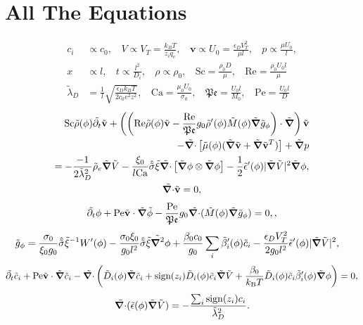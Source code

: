 \documentclass[a4paper,10pt]{article}
\renewcommand{\v}[1]{\mathbf{#1}}
\renewcommand{\v}[1]{\ensuremath{\mathbf{#1}}} %
\newcommand{\ti}[1]{\ensuremath{\tilde{#1}}} %
\newcommand{\gv}[1]{\ensuremath{\mbox{\boldmath$ #1 $}}}
\newcommand{\grad}[1]{\gv{\nabla} #1} %
\renewcommand{\div}[1]{\gv{\nabla} \cdot #1} %
\newcommand{\laplacian}[1]{\grad^2 #1}
\newcommand{\pdt}[1]{\partial_t #1}
\begin{document}
\section{All The Equations}
\begin{align}
c_i &\propto c_0, ~~~~ V \propto V_T = \frac{k_B T}{z_i q_e}, ~~~~\v{v} \propto U_0 = \frac{\epsilon_D V_T^2}{\mu l}, ~~~~p \propto \frac{\mu U_0}{l},\\
x &\propto l , ~~~~ t \propto \frac{l^2}{D_i}, ~~~~ \rho \propto \rho_0, ~~~~ \mathrm{Sc} = \frac{\rho_0 D}{\mu}, ~~~~\mathrm{Re} = \frac{\rho_0 U_0 l}{\mu} \\
\tilde{\lambda}_D &= \frac{1}{l}\sqrt{\frac{\epsilon_D k_B T}{2 c_0 e^2 z^2}}, ~~~~ \mathrm{Ca} = \frac{\mu_0 U_0}{\sigma_0}, ~~~~\mathfrak{Pe} = \frac{U_0 l}{M_0}, ~~~~ \mathrm{Pe} = \frac{U_0 l}{D }
\end{align}
\begin{gather}
\begin{split}	
\mathrm{Sc} \ti{\rho}(\phi) \ti{\pdt{}} \ti{\v{v}}
+ \left( \left( \mathrm{Re} \ti\rho(\phi) \ti{\v{v}} - \frac{\mathrm{Re} }{\mathfrak{Pe}}g_0\ti\rho'(\phi) \ti M(\phi) \ti{\grad{}} \ti g_\phi  \right) \cdot \ti{\grad{}} \right) \ti{\v{v}}\\
- \ti{\div{}} \left[\ti \mu(\phi)(\ti{\grad{}} \ti{\v{v}} + \ti{\grad{}} \ti{\v{v}} ^T) \right] + \ti{\grad{}} p \\
= - \frac{-1}{2\tilde{\lambda}_D^2} \ti \rho_e \ti{\grad{}} \ti{V} - \frac{ \xi_0 }{l\mathrm{Ca}}\hat{\ti{\sigma}} \ti \xi\ti{\div{}} \left[ \ti{\grad{}} \phi \otimes \ti{\grad{}} \phi \right] - \frac 1 2 \ti \epsilon'(\phi) | \ti{\grad{}} \ti V |^2 \ti{\grad{}} \phi,
\end{split}\\
\ti{\div{}} \ti{\v{v}} = 0, 
\end{gather}
\begin{gather}
\ti{\pdt{}} \phi + \mathrm{Pe}\ti{\v v} \cdot \ti{\grad{}}\ti{\phi} - \frac{\mathrm{Pe} }{\mathfrak{Pe}} g_0\ti{\div{}} (\ti{M}(\phi) \ti{\grad{}} \ti{g}_\phi ) = 0,,
\end{gather}
\begin{align}
\tilde{g}_\phi &= \frac{\sigma_0}{\xi_0 g_0 }\hat{\ti{\sigma}}\ti{\xi}^{-1}W'(\phi) - \frac{\sigma_0 \xi_0}{g_0 l^2}\hat{\ti{\sigma}}\ti{\xi}\ti{\laplacian{}}\phi + \frac{\beta_0 c_0}{g_0}\sum_i \ti{\beta}_i'(\phi) \ti{c}_i - \frac{\epsilon_D V_T^2}{2 g_0 l^2} \ti{\epsilon}'(\phi) | \ti{\grad{}} \ti{V} |^2 ,
\end{align}
\begin{gather}
\ti{\pdt{}} \ti{c}_i + \mathrm{Pe}\ti{\v{v}} \cdot \ti{\grad{}} \ti{c}_i - \ti{\div{}} \left( \ti{D}_{i} (\phi) \ti{\grad{}} \ti{c}_i + \mathrm{sign}(z_i)\ti{D}_i(\phi)\ti{c}_i \ti{\grad{}} \ti{V} +\frac{ \beta_0}{k_{\rm B} T }\ti{D}_i(\phi)\ti{c}_i\ti{\beta}_i'(\phi) \ti{\grad{}} \phi \right) = 0,
\end{gather}
\begin{gather}
\ti{\div{}} ( \ti{\epsilon} (\phi) \ti{\grad{}} \ti{V} ) = - \frac{\sum_i \mathrm{sign}(z_i) c_i}{\ti{\lambda}_D^2}.
\end{gather}
\newpage
\end{document}
